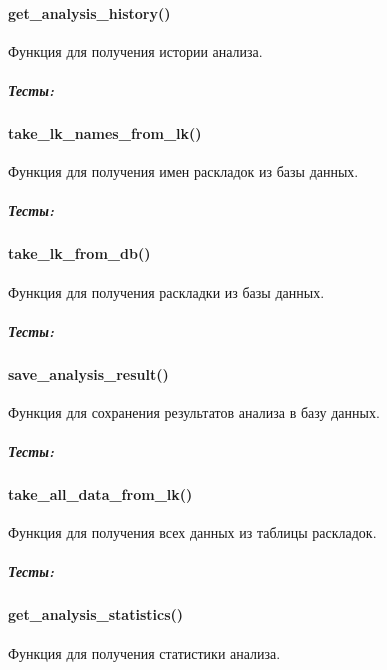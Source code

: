 \documentclass[a4paper,11pt,russian,openany,oneside]{sphinxmanual}
\begin{document}
\paragraph{get\_analysis\_history()}
\label{\detokenize{tests_module:get-analysis-history}}
\sphinxAtStartPar
Функция для получения истории анализа.


\subparagraph{Тесты:}
\label{\detokenize{tests_module:id11}}

\paragraph{take\_lk\_names\_from\_lk()}
\label{\detokenize{tests_module:take-lk-names-from-lk}}
\sphinxAtStartPar
Функция для получения имен раскладок из базы данных.


\subparagraph{Тесты:}
\label{\detokenize{tests_module:id12}}

\paragraph{take\_lk\_from\_db()}
\label{\detokenize{tests_module:take-lk-from-db}}
\sphinxAtStartPar
Функция для получения раскладки из базы данных.


\subparagraph{Тесты:}
\label{\detokenize{tests_module:id13}}

\paragraph{save\_analysis\_result()}
\label{\detokenize{tests_module:save-analysis-result}}
\sphinxAtStartPar
Функция для сохранения результатов анализа в базу данных.


\subparagraph{Тесты:}
\label{\detokenize{tests_module:id14}}

\paragraph{take\_all\_data\_from\_lk()}
\label{\detokenize{tests_module:take-all-data-from-lk}}
\sphinxAtStartPar
Функция для получения всех данных из таблицы раскладок.


\subparagraph{Тесты:}
\label{\detokenize{tests_module:id15}}

\paragraph{get\_analysis\_statistics()}
\label{\detokenize{tests_module:get-analysis-statistics}}
\sphinxAtStartPar
Функция для получения статистики анализа.
\end{document}
